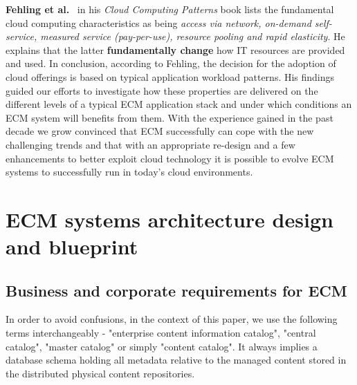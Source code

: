 \documentclass[EPiC]{easychair} %
\begin{document}
     
    \textbf{Fehling et al.}~\cite{CloudComputingPatterns2014} in his \textit{Cloud Computing Patterns} book lists the fundamental cloud computing characteristics as being \textit{access via network, on-demand self-service, measured service (pay-per-use), resource pooling and rapid elasticity}. He explains that the latter \textbf{fundamentally change} how IT resources are provided and used. In conclusion, according to Fehling, the decision for the adoption of cloud offerings is based on typical application workload patterns. His findings guided our efforts to investigate how these properties are delivered on the different levels of a typical ECM application stack and under which conditions an ECM system will benefits from them. With the experience gained in the past decade we grow convinced that ECM successfully can cope with the new challenging trends and that with an appropriate re-design and a few enhancements to better exploit cloud technology it is possible to evolve ECM systems to successfully run in today's cloud environments. 
\section{ECM systems architecture design and blueprint}
\label{sect:architecture-design}
\subsection{Business and corporate requirements for ECM}
\label{subsect:business-requirements}
    In order to avoid confusions, in the context of this paper, we use the following terms interchangeably - "enterprise content information catalog", "central catalog", "master catalog" or simply "content catalog". It always implies a database schema holding all metadata relative to the managed content stored in the distributed physical content repositories.\\
    
\end{document}
